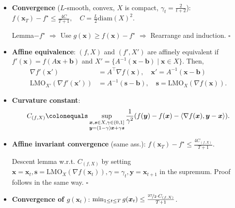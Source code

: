 \documentclass[8pt,a4paper]{extarticle}
\renewcommand{\proof}[1]{\begin{tcolorbox}#1 \hfill $\square$\end{tcolorbox}}
\newcommand{\lft}{\mathopen{}\mathclose\bgroup\left}
\newcommand{\rgt}{\aftergroup\egroup\right}
\renewcommand{\vec}[1]{\bm{#1}}
\newcommand{\mat}[1]{#1}
\newenvironment{topic}[1]
{\textbf{\sffamily \colorbox{black}{\rlap{\textbf{\textcolor{white}{#1}}}\hspace{\linewidth}\hspace{-2\fboxsep}}} \\ \vspace{0.2cm}}
{}
\begin{document}
\begin{multicols*}{2}
\begin{topic}{Frank-Wolfe}
\begin{itemize}
            \item \textbf{Convergence} ($L$-smooth, convex, $X$ is compact, $\gamma_t = \frac{2}{t+2}$): \\
                  $f(\vec{x}_T) - f^\star \leq \frac{4C}{T+1}, \quad C = \frac{L}{2} \mathrm{diam}(X)^2$.
                  \proof{Lemma$-f^\star$ $\Rightarrow$ Use $g(\vec{x}) \geq f(\vec{x}) - f^\star$ $\Rightarrow$ Rearrange and induction.}
            \item \textbf{Affine equivalence}: $(f, X)$ and $(f', X')$ are affinely equivalent if $f'(\vec{x}) = f(\mat{A} \vec{x} + \vec{b})$ and $X' = \{ \mat{A}^{-1}(\vec{x} - \vec{b}) \mid \vec{x} \in X \}$. Then,
                  \begin{align*}
                      \nabla f'(\vec{x}')                    & = \mat{A}^\top \nabla f(\vec{x}), \quad \vec{x}' = \mat{A}^{-1} (\vec{x} - \vec{b})   \\
                      \mathrm{LMO}_{X'}(\nabla f'(\vec{x}')) & = \mat{A}^{-1}(\vec{s} - \vec{b}), \quad \vec{s} = \mathrm{LMO}_X(\nabla f(\vec{x})).
                  \end{align*}
            \item \textbf{Curvature constant}: \[
                      C_{(f,X)} \colonequals \sup_{\substack{\vec{x}, \vec{s}\in X, \gamma \in (0,1] \\ \vec{y} = (1-\gamma)\vec{x} + \gamma \vec{s}}} \frac{1}{\gamma^2}\lft( f(\vec{y}) - f(\vec{x}) - \langle \nabla f(\vec{x}), \vec{y} - \vec{x} \rangle \rgt).
                  \]
            \item \textbf{Affine invariant convergence} (same ass.): $f(\vec{x}_T) - f^\star \leq \frac{4 C_{(f,X)}}{T+1}$.
                  \proof{Descent lemma w.r.t. $C_{(f,X)}$ by setting $\vec{x} = \vec{x}_t, \vec{s} = \mathrm{LMO}_X(\nabla f(\vec{x}_t)), \gamma = \gamma_t, \vec{y} = \vec{x}_{t+1}$ in the supremum. Proof follows in the same way.}
            \item \textbf{Convergence of $g(\vec{x}_t)$}: $\min_{1 \leq t \leq T} g(\vec{x}_t) \leq \frac{\nicefrac{27}{2} \cdot C_{(f, X)}}{T+1}$.
        \end{itemize}
    \end{topic}


\end{multicols*}
\end{document}
